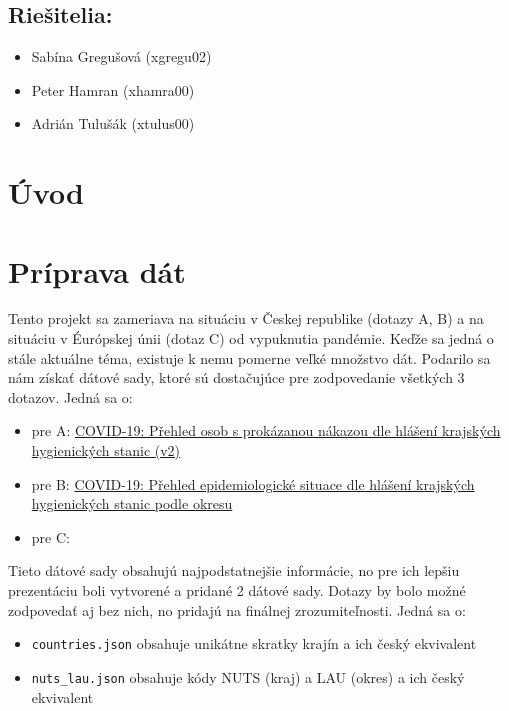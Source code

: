 \documentclass [11pt, a4paper]{article}
\begin{document}
\subsection*{Riešitelia:}
\begin{itemize}[noitemsep]
\item Sabína Gregušová (xgregu02)
\item Peter Hamran (xhamra00)
\item Adrián Tulušák (xtulus00)
\end{itemize}

\section{Úvod}

\section{Príprava dát}

Tento projekt sa zameriava na situáciu v Českej republike (dotazy A, B) a na situáciu v Éurópskej únii (dotaz C) od vypuknutia pandémie. Keďže sa jedná o stále aktuálne téma, existuje k nemu pomerne veľké množstvo dát. Podarilo sa nám získať dátové sady, ktoré sú dostačujúce pre zodpovedanie všetkých 3 dotazov. Jedná sa o:

\begin{itemize}
\item pre A: \href{https://onemocneni-aktualne.mzcr.cz/api/v2/covid-19/osoby.min.json }{COVID-19: Přehled osob s prokázanou nákazou dle hlášení krajských hygienických stanic (v2)}
\item pre B: \href{https://onemocneni-aktualne.mzcr.cz/api/v2/covid-19/kraj-okres-nakazeni-vyleceni-umrti.min.json}{COVID-19: Přehled epidemiologické situace dle hlášení krajských hygienických stanic podle okresu}
\item pre C: 
\end{itemize}

Tieto dátové sady obsahujú najpodstatnejšie informácie, no pre ich lepšiu prezentáciu boli vytvorené a pridané 2 dátové sady. Dotazy by bolo možné zodpovedať aj bez nich, no pridajú na finálnej zrozumiteľnosti. Jedná sa o:
\begin{itemize}
\item \texttt{countries.json} obsahuje unikátne skratky krajín a ich český ekvivalent
\item \texttt{nuts\_lau.json} obsahuje kódy NUTS (kraj) a LAU (okres) a ich český ekvivalent
\end{itemize} 
\end{document}
